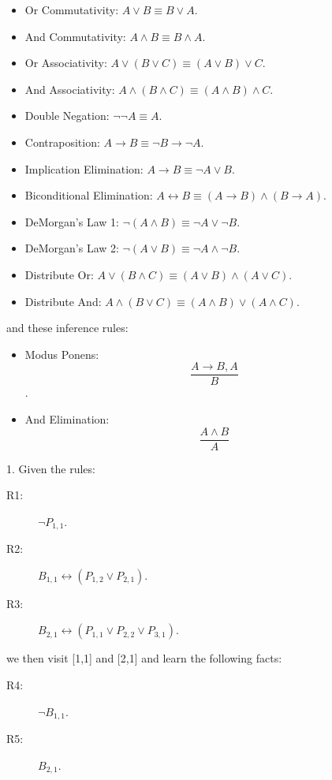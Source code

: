 \documentclass[]{article}
\begin{document}
\begin{itemize}
\item Or Commutativity: $A \vee B \equiv B \vee A$.
\item And Commutativity: $A \wedge B \equiv B \wedge A$.
\item Or Associativity: $A \vee (B \vee C) \equiv (A \vee B) \vee C$.
\item And Associativity: $A \wedge (B \wedge C) \equiv (A \wedge B) \wedge C$.
\item Double Negation: $\neg \neg A \equiv A$.
\item Contraposition: $A \rightarrow B \equiv \neg B \rightarrow \neg A$.
\item Implication Elimination: $A \rightarrow B \equiv \neg A \vee B$.
\item Biconditional Elimination: $A \leftrightarrow B \equiv (A \rightarrow B) \wedge (B \rightarrow A)$.
\item DeMorgan's Law 1: $\neg (A \wedge B) \equiv \neg A \vee \neg B$.
\item DeMorgan's Law 2: $\neg (A \vee B) \equiv \neg A \wedge \neg B$.
\item Distribute Or: $A \vee (B \wedge C) \equiv (A \vee B) \wedge (A \vee C)$.
\item Distribute And: $A \wedge (B \vee C) \equiv (A \wedge B) \vee (A \wedge C)$.
\end{itemize}
and these inference rules:
\begin{itemize}
\item Modus Ponens: \[\frac{A \rightarrow B, A}{B}\].
\item And Elimination: \[\frac{A \wedge B}{A}\]
\end{itemize}

\newpage

1.  Given the rules:
\begin{description}
\item[R1:] $\neg P_{1,1}$.
\item[R2:] $B_{1,1} \leftrightarrow (P_{1,2} \vee P_{2,1})$.
\item[R3:] $B_{2,1} \leftrightarrow (P_{1,1} \vee P_{2,2} \vee P_{3,1})$. 
\end{description}

we then visit [1,1] and [2,1] and learn the following facts:
\begin{description}
\item[R4:] $\neg B_{1,1}$.
\item[R5:] $B_{2,1}$.
\end{description}
\end{document}
